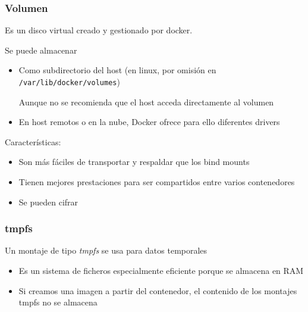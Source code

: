 \documentclass[ucs]{beamer}
\begin{document}
\begin{frame}[fragile]
\frametitle{Volumen}

Es un disco virtual creado y gestionado por docker.

Se puede almacenar
\begin{itemize}
\item

Como subdirectorio del host
(en linux, por omisión en
\verb|/var/lib/docker/volumes|)

Aunque no se recomienda que el host acceda directamente
al volumen

\item
En host remotos o en la nube, Docker ofrece para ello
diferentes drivers
\end{itemize}


Características:

\begin{itemize}
\item
Son más fáciles de transportar y respaldar que los bind mounts
\item
Tienen mejores prestaciones para ser compartidos entre varios
contenedores
\item
Se pueden cifrar
\end{itemize}

\end{frame}



\begin{frame}[fragile]
\frametitle{tmpfs}

Un montaje de tipo \emph{tmpfs} se usa para datos temporales

\begin{itemize}
\item
Es un sistema de ficheros especialmente eficiente porque se almacena en RAM

\item
Si creamos una imagen a partir del contenedor, el contenido de los montajes
tmpfs no se almacena


\end{itemize}

\end{frame}
\end{document}
